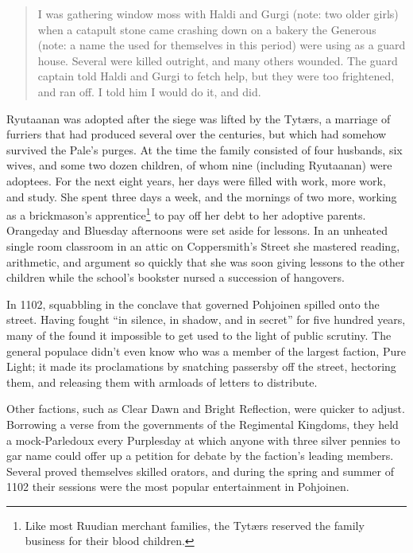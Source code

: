 \documentclass[12pt]{report}
\begin{document}
\begin{quotation}
I was gathering window moss with Haldi and Gurgi (note: two older
girls) when a catapult stone came crashing down on a bakery the
Generous (note: a name the {\aemott} used for themselves in this
period) were using as a guard house.  Several were killed outright,
and many others wounded.  The guard captain told Haldi and Gurgi to
fetch help, but they were too frightened, and ran off.  I told him I
would do it, and did.
\end{quotation}

Ryutaanan was adopted after the siege was lifted by the Tyt{\ae}rs, a
marriage of furriers that had produced several {\aemott} over the
centuries, but which had somehow survived the Pale's purges.  At the
time the family consisted of four husbands, six wives, and some two
dozen children, of whom nine (including Ryutaanan) were adoptees.  For
the next eight years, her days were filled with work, more work, and
study.  She spent three days a week, and the mornings of two more,
working as a brickmason's apprentice\footnote{Like most Ruudian
merchant families, the Tyt{\ae}rs reserved the family business for their
blood children.} to pay off her debt to her adoptive parents.
Orangeday and Bluesday afternoons were set aside for lessons.  In an
unheated single room classroom in an attic on Coppersmith's Street she
mastered reading, arithmetic, and argument so quickly that she was
soon giving lessons to the other children while the school's bookster
nursed a succession of hangovers.

In 1102, squabbling in the conclave that governed Pohjoinen spilled
onto the street.  Having fought ``in silence, in shadow, and in secret''
for five hundred years, many of the {\aemott} found it impossible to
get used to the light of public scrutiny.  The general populace didn't
even know who was a member of the largest faction, Pure Light; it made
its proclamations by snatching passersby off the street, hectoring
them, and releasing them with armloads of letters to distribute.

Other factions, such as Clear Dawn and Bright Reflection, were quicker
to adjust.  Borrowing a verse from the governments of the Regimental
Kingdoms, they held a mock-Parledoux every Purplesday at which anyone
with three silver pennies to gar name could offer up a petition for
debate by the faction's leading members.  Several proved themselves
skilled orators, and during the spring and summer of 1102 their
sessions were the most popular entertainment in Pohjoinen.
\end{document}
